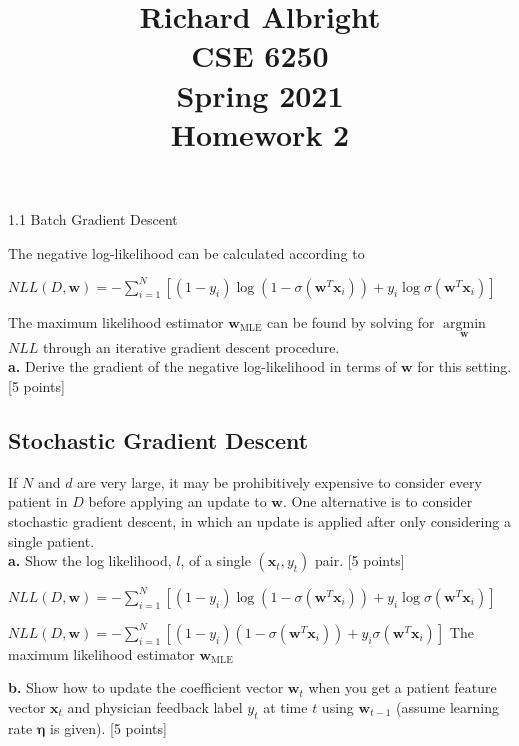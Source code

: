 \documentclass[12pt]{article}
\begin{document}
\title{Richard Albright\\CSE 6250\\
Spring 2021 \\
Homework 2 \\ 
\small}
\date{}
\maketitle


{1.1 Batch Gradient Descent}


The negative log-likelihood can be calculated according to
\begin{center}
$NLL\left (D, \mathbf{w} \right ) = -\sum_{i=1}^{N} \left [ \left ( 1 - y_i \right ) \log(1-\sigma(\mathbf{w}^T\mathbf{x}_i)) + y_i\log \sigma(\mathbf{w}^T\mathbf{x}_i)  \right ]$ \end{center}
The maximum likelihood estimator $\mathbf{w}_{\text{MLE}}$ can be found by solving for $\underset{\mathbf{w}}{\operatorname{arg\min}}$ $NLL$ through an iterative gradient descent procedure.\\

\textbf{a.} Derive the gradient of the negative log-likelihood in terms of $\mathbf{w}$ for this setting. [5 points] 

\subsection{Stochastic Gradient Descent}
If $N$ and $d$ are very large, it may be prohibitively expensive to consider every patient in $D$ before applying an update to $\mathbf{w}$. One alternative is to consider stochastic gradient descent, in which an update is applied after only considering a single patient. \\

\textbf{a.} Show the log likelihood, $l$, of a single $(\mathbf{x}_t, y_t)$ pair. [5 points]
\vspace{5mm}

$NLL\left (D, \mathbf{w} \right ) = -\sum_{i=1}^{N} \left [ \left ( 1 - y_i \right ) \log(1-\sigma(\mathbf{w}^T\mathbf{x}_i)) + y_i\log \sigma(\mathbf{w}^T\mathbf{x}_i)  \right ]$

$NLL\left (D, \mathbf{w} \right ) = -\sum_{i=1}^{N} \left [ \left ( 1 - y_i \right ) (1-\sigma(\mathbf{w}^T\mathbf{x}_i)) + y_i \sigma(\mathbf{w}^T\mathbf{x}_i)  \right ]$
The maximum likelihood estimator $\mathbf{w}_{\text{MLE}}$ 

\textbf{b.} Show how to update the coefficient vector $\mathbf{w}_t$ when you get a patient feature vector $\mathbf{x}_t$ and physician feedback label $y_t$ at time $t$ using $\mathbf{w}_{t-1}$ (assume learning rate $\mathbf{\eta}$ is given). [5 points]
\end{document}
